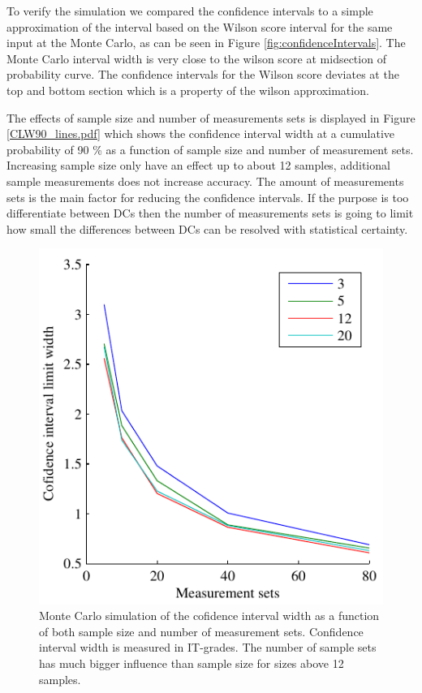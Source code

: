 \documentclass[aip,amsmath, preprint, author-year]{revtex4-1}
\begin{document}
To verify the simulation we compared the confidence intervals to a simple approximation of the interval based on the Wilson score interval for the same input at the Monte Carlo, as can be seen in Figure \ref{fig:confidenceIntervals}. The Monte Carlo interval width is very close to the wilson score at midsection of probability curve. 
The confidence intervals for the Wilson score deviates at the top and bottom section which is a property of the wilson approximation.

The effects of sample size and number of measurements sets is displayed in Figure \ref{CLW90_lines.pdf} which shows the confidence interval width at a cumulative probability of 90 \% as a function of sample size and number of measurement sets. 
Increasing sample size only have an effect up to about 12 samples, additional sample measurements does not increase accuracy. 
The amount of measurements sets is the main factor for reducing the confidence intervals. 
If the purpose is too differentiate between DCs then the number of measurements sets is going to limit how small the differences between DCs can be resolved with statistical certainty.

\begin{figure}
\includegraphics{CLW90_lines.pdf}
\caption{\label{fig:cl_line} Monte Carlo simulation of the cofidence interval width as a function of both sample size and number of measurement sets. 
Confidence interval width is measured in IT-grades. 
The number of sample sets has much bigger influence than sample size for sizes above 12 samples.}
\end{figure}
\end{document}
